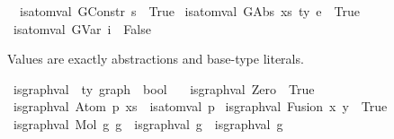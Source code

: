 \begin{isabellebody}
\ \ {\isachardoublequoteopen}is{\isacharunderscore}{\kern0pt}atom{\isacharunderscore}{\kern0pt}val\ {\isacharparenleft}{\kern0pt}GConstr\ s{\isacharparenright}{\kern0pt}\ {\isacharequal}{\kern0pt}\ True{\isachardoublequoteclose}\isanewline
{\isacharbar}{\kern0pt}\ {\isachardoublequoteopen}is{\isacharunderscore}{\kern0pt}atom{\isacharunderscore}{\kern0pt}val\ {\isacharparenleft}{\kern0pt}GAbs\ xs\ ty\ e{\isacharparenright}{\kern0pt}\ {\isacharequal}{\kern0pt}\ True{\isachardoublequoteclose}\isanewline
{\isacharbar}{\kern0pt}\ {\isachardoublequoteopen}is{\isacharunderscore}{\kern0pt}atom{\isacharunderscore}{\kern0pt}val\ {\isacharparenleft}{\kern0pt}GVar\ i{\isacharparenright}{\kern0pt}\ {\isacharequal}{\kern0pt}\ False{\isachardoublequoteclose}%
\begin{isamarkuptext}%
Values are exactly abstractions and base-type literals.%
\end{isamarkuptext}\isamarkuptrue%
\isamarkupfalse%
\ is{\isacharunderscore}{\kern0pt}graph{\isacharunderscore}{\kern0pt}val\ {\isacharcolon}{\kern0pt}{\isacharcolon}{\kern0pt}\ {\isachardoublequoteopen}{\isacharprime}{\kern0pt}ty\ graph\ {\isacharequal}{\kern0pt}{\isachargreater}{\kern0pt}\ bool{\isachardoublequoteclose}\ \isanewline
\ \ {\isachardoublequoteopen}is{\isacharunderscore}{\kern0pt}graph{\isacharunderscore}{\kern0pt}val\ Zero\ {\isacharequal}{\kern0pt}\ True{\isachardoublequoteclose}\isanewline
{\isacharbar}{\kern0pt}\ {\isachardoublequoteopen}is{\isacharunderscore}{\kern0pt}graph{\isacharunderscore}{\kern0pt}val\ {\isacharparenleft}{\kern0pt}Atom\ p\ xs{\isacharparenright}{\kern0pt}\ {\isacharequal}{\kern0pt}\ is{\isacharunderscore}{\kern0pt}atom{\isacharunderscore}{\kern0pt}val\ p{\isachardoublequoteclose}\isanewline
{\isacharbar}{\kern0pt}\ {\isachardoublequoteopen}is{\isacharunderscore}{\kern0pt}graph{\isacharunderscore}{\kern0pt}val\ {\isacharparenleft}{\kern0pt}Fusion\ x\ y{\isacharparenright}{\kern0pt}\ {\isacharequal}{\kern0pt}\ True{\isachardoublequoteclose}\isanewline
{\isacharbar}{\kern0pt}\ {\isachardoublequoteopen}is{\isacharunderscore}{\kern0pt}graph{\isacharunderscore}{\kern0pt}val\ {\isacharparenleft}{\kern0pt}Mol\ g{}\ g{}{\isacharparenright}{\kern0pt}\ {\isacharequal}{\kern0pt}\ {\isacharparenleft}{\kern0pt}is{\isacharunderscore}{\kern0pt}graph{\isacharunderscore}{\kern0pt}val\ g{}\ {\isasymand}\ is{\isacharunderscore}{\kern0pt}graph{\isacharunderscore}{\kern0pt}val\ g{}{\isacharparenright}{\kern0pt}{\isachardoublequoteclose}\isanewline

\end{isabellebody}

